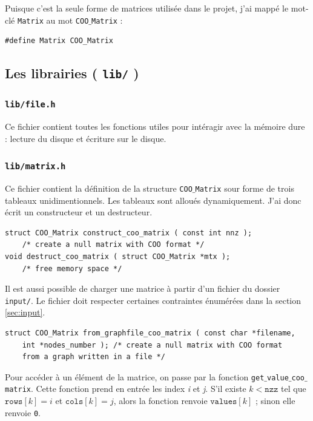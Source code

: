 \documentclass[a4paper,12pt]{article}
\begin{document}
\medskip

Puisque c'est la seule forme de matrices utilisée dans le projet, j'ai mappé le mot-clé \texttt{Matrix} au mot \texttt{COO$\_$Matrix} :

\begin{lstlisting}
#define Matrix COO_Matrix
\end{lstlisting}

\medskip

\subsection{Les librairies ( \texttt{lib/} )}

\subsubsection{\texttt{lib/file.h}}

Ce fichier contient toutes les fonctions utiles pour intéragir avec la mémoire dure : lecture du disque et écriture sur le disque.

\subsubsection{\texttt{lib/matrix.h}}

Ce fichier contient la définition de la structure \texttt{COO$\_$Matrix} sour forme de trois tableaux unidimentionnels. Les tableaux sont alloués dynamiquement. J'ai donc écrit un constructeur et un destructeur.

\begin{lstlisting}
struct COO_Matrix construct_coo_matrix ( const int nnz ); 
	/* create a null matrix with COO format */
void destruct_coo_matrix ( struct COO_Matrix *mtx );
	/* free memory space */
\end{lstlisting}

\medskip

Il est aussi possible de charger une matrice à partir d'un fichier du dossier \texttt{input/}. Le fichier doit respecter certaines contraintes énumérées dans la section \ref{sec:input}.

\begin{lstlisting}
struct COO_Matrix from_graphfile_coo_matrix ( const char *filename, 
	int *nodes_number ); /* create a null matrix with COO format 
	from a graph written in a file */
\end{lstlisting}

\medskip

Pour accéder à un élément de la matrice, on passe par la fonction \texttt{get$\_$value$\_$coo$\_$ma\-trix}. Cette fonction prend en entrée les index \textit{i} et \textit{j}. S'il existe $k < \texttt{nzz}$ tel que $\texttt{rows}[k] = i$ et $\texttt{cols}[k] = j$, alors la fonction renvoie $\texttt{values}[k]$ ; sinon elle renvoie \texttt{0}.
\end{document}
